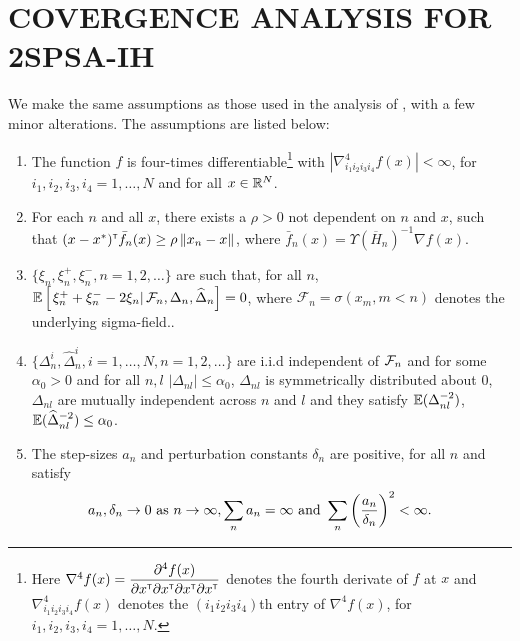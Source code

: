 \documentclass[twocolumn]{IEEEtran}
\begin{document}
\section{COVERGENCE ANALYSIS FOR 2SPSA-IH}
\label{sec:2spsa-results}
We make the same assumptions as those used in the analysis of \cite{prashanth2015rdsa}, with a few minor alterations. The assumptions are listed below:
\begin{enumerate}[label=(\textbf{C\arabic*}),resume]
\item  The function
$f$ is four-times differentiable\footnote{Here $\nabla^4 f(x) = \dfrac{\partial^4 f (x)}{\partial x^\mathsf{\scriptscriptstyle T} \partial x^\mathsf{\scriptscriptstyle T} \partial x^\mathsf{\scriptscriptstyle T} \partial x^\mathsf{\scriptscriptstyle T}}$ denotes the fourth derivate of $f$ at $x$ and $\nabla^4_{i_1 i_2 i_3 i_4} f(x)$ denotes the $(i_1 i_2 i_3 i_4)$th entry of $\nabla^4 f(x)$, for $i_1, i_2, i_3,i_4=1,\ldots, N$.} with $\left|\nabla^4_{i_1 i_2 i_3 i_4} f(x) \right| < \infty$, for $i_1, i_2, i_3,i_4=1,\ldots, N$ and for all $x\in \mathbb{R}^N$. 


\item For each $n$ and all $x$, there exists a $\rho>0$ not dependent on $n$ and $x$, such that $(x-x^*)^\mathsf{\scriptscriptstyle T} \bar f_n(x) \ge \rho \left\| x_n - x\right\|$, where $\bar f_n(x) = \Upsilon(\overline H_n)^{-1} \nabla f(x)$.

\item $\{\xi_n, \xi_n^+,\xi_n^-, n=1,2,\ldots\}$ are such that, for all $n$, $\mathbb{E}\left[\left. \xi_n^+ + \xi_n^- - 2 \xi_n \right| \mathcal{F}_n, \Delta_n, \widehat \Delta_n \right] = 0$, where $\mathcal{F}_n = \sigma(x_m,m < n)$ denotes the underlying sigma-field.. 

\item $\{\Delta_n^i,\widehat\Delta_n^i, i=1,\ldots,N, n=1,2,\ldots\}$ are i.i.d independent of $\mathcal{F}_n$ and for some $\alpha_0 > 0$ and for all $n,l$ $|\Delta_{nl}|\le \alpha_0$, $\Delta_{nl}$ is symmetrically distributed about 0, $\Delta_{nl}$ are mutually independent across $n$ and $l$ and they satisfy $\mathbb{E} (\Delta_{nl}^{-2})$,$\mathbb{E} (\widehat\Delta_{nl}^{-2}) \le \alpha_0$.

\item  The step-sizes $a_n$ and perturbation constants $\delta_n$ are positive, for all $n$ and satisfy
$$\hspace{-1.7em} a_n, \delta_n \rightarrow 0\text{ as } n \rightarrow \infty, 
\sum_n a_n=\infty \text{ and } \sum_n \left(\frac{a_n}{\delta_n}\right)^2 <\infty.$$


\end{enumerate}
\end{document}
